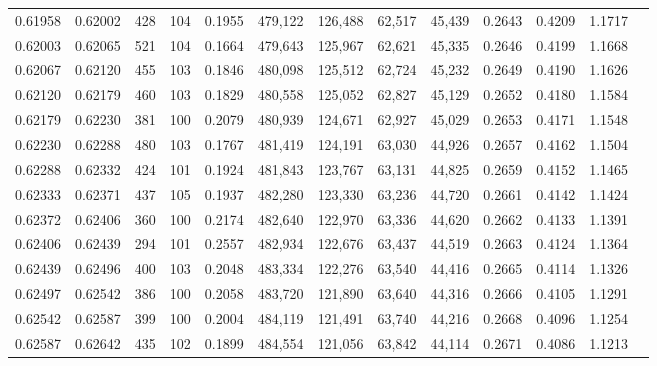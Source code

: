 \begin{tabular}{rrrrrrrrrrrrr}
0.61958 & 0.62002 &   428 & 104 &                                     0.1955 & 479,122 & 126,488 &  62,517 &  45,439 & 0.2643 & 0.4209 & 1.1717 \\
0.62003 & 0.62065 &   521 & 104 &                                     0.1664 & 479,643 & 125,967 &  62,621 &  45,335 & 0.2646 & 0.4199 & 1.1668 \\
0.62067 & 0.62120 &   455 & 103 &                                     0.1846 & 480,098 & 125,512 &  62,724 &  45,232 & 0.2649 & 0.4190 & 1.1626 \\
0.62120 & 0.62179 &   460 & 103 &                                     0.1829 & 480,558 & 125,052 &  62,827 &  45,129 & 0.2652 & 0.4180 & 1.1584 \\
0.62179 & 0.62230 &   381 & 100 &                                     0.2079 & 480,939 & 124,671 &  62,927 &  45,029 & 0.2653 & 0.4171 & 1.1548 \\
0.62230 & 0.62288 &   480 & 103 &                                     0.1767 & 481,419 & 124,191 &  63,030 &  44,926 & 0.2657 & 0.4162 & 1.1504 \\
0.62288 & 0.62332 &   424 & 101 &                                     0.1924 & 481,843 & 123,767 &  63,131 &  44,825 & 0.2659 & 0.4152 & 1.1465 \\
0.62333 & 0.62371 &   437 & 105 &                                     0.1937 & 482,280 & 123,330 &  63,236 &  44,720 & 0.2661 & 0.4142 & 1.1424 \\
0.62372 & 0.62406 &   360 & 100 &                                     0.2174 & 482,640 & 122,970 &  63,336 &  44,620 & 0.2662 & 0.4133 & 1.1391 \\
0.62406 & 0.62439 &   294 & 101 &                                     0.2557 & 482,934 & 122,676 &  63,437 &  44,519 & 0.2663 & 0.4124 & 1.1364 \\
0.62439 & 0.62496 &   400 & 103 &                                     0.2048 & 483,334 & 122,276 &  63,540 &  44,416 & 0.2665 & 0.4114 & 1.1326 \\
0.62497 & 0.62542 &   386 & 100 &                                     0.2058 & 483,720 & 121,890 &  63,640 &  44,316 & 0.2666 & 0.4105 & 1.1291 \\
0.62542 & 0.62587 &   399 & 100 &                                     0.2004 & 484,119 & 121,491 &  63,740 &  44,216 & 0.2668 & 0.4096 & 1.1254 \\
0.62587 & 0.62642 &   435 & 102 &                                     0.1899 & 484,554 & 121,056 &  63,842 &  44,114 & 0.2671 & 0.4086 & 1.1213 \\

\end{tabular}
